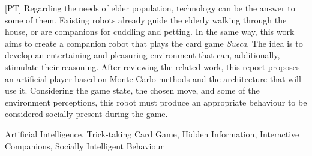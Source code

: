 \begin{resumo}

[PT] Regarding the needs of elder population, technology can be the answer to some of them.
Existing robots already guide the elderly walking through the house, or are companions for cuddling and petting. In the same way, this work aims to create a companion robot that plays the card game \emph{Sueca}. The idea is to develop an entertaining and pleasuring environment that can, additionally, stimulate their reasoning.
After reviewing the related work, this report proposes an artificial player based on Monte-Carlo methods and the architecture that will use it. Considering the game state, the chosen move, and some of the environment perceptions, this robot must produce an appropriate behaviour to be considered socially present during the game.

\end{resumo}

\begin{palavraschave}
Artificial Intelligence, Trick-taking Card Game, Hidden Information, Interactive Companions, Socially Intelligent Behaviour
\end{palavraschave}

\clearpage
\thispagestyle{empty}
\cleardoublepage